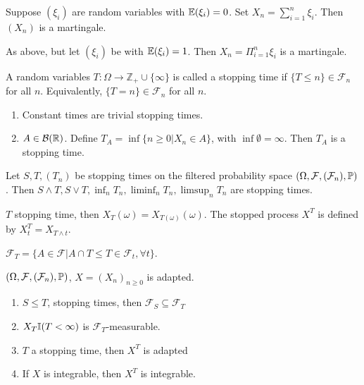 \begin{exmp}
  \label{defn:discrete_time_martingales:2}
  Suppose $(\xi_{i})$ are \iid random variables with $\E{\xi_{i}} = 0$.
  Set $X_{n} = \sum_{i=1}^{n} \xi_{i}$.  Then $(X_{n})$ is a martingale.
\end{exmp}

\begin{exmp}
  \label{defn:discrete_time_martingales:3}
  As above, but let $(\xi_{i})$ be \iid with $\E{\xi_{i}} = 1$. Then
  $X_{n} = \Pi_{i=1}^{n} \xi_{i}$ is a martingale.
\end{exmp}

\begin{defn}
  \label{defn:discrete_time_martingales:4}
  A random variables $T: \Omega \rightarrow \mathbb{Z}_{+} \cup \{ \infty \}$
  is called a stopping time if $\{ T \leq n \} \in \mathcal{F}_{n}$
  for all $n$.  Equivalently, $\{ T = n \} \in \mathcal{F}_{n}$ for
  all $n$.
\end{defn}

\begin{exmp}
  \label{defn:discrete_time_martingales:5}
  \begin{enumerate}
  \item Constant times are trivial stopping times.
  \item $A \in \mathcal{B}(\mathbb{R})$.  Define $T_{A} = \inf \{ n \geq 0 |
    X_{n} \in A \}$, with $\inf \emptyset = \infty$.  Then $T_{A}$ is a
    stopping time.
  \end{enumerate}
\end{exmp}

\begin{proposition}
  Let $S, T, (T_{n})$ be stopping times on the filtered probability
  space $(\Omega, \mathcal{F}, (\mathcal{F}_{n}), \Prob)$.  Then $S \wedge
  T, S \vee T, \inf_{n} T_{n}, \liminf_{n} T_{n}, \limsup_{n} T_{n}$
  are stopping times. 
\end{proposition}

\begin{notation}
  $T$ stopping time, then $X_{T}(\omega) = X_{T(\omega)}(\omega)$. The
  stopped process $X^{T}$ is defined by $X^{T}_{t} = X_{T \wedge t}$.

  $\mathcal{F}_{T} = \{ A \in \mathcal{F} | A \cap {T \leq T} \in
  \mathcal{F}_{t}, \forall t \}$.
\end{notation}

\begin{proposition}
  $(\Omega, \mathcal{F}, (\mathcal{F}_{n}), \Prob)$, $X = (X_{n})_{n
    \geq 0}$ is adapted.
  \begin{enumerate}
  \item $S \leq T$, stopping times, then $\mathcal{F}_{S} \subseteq \mathcal{F}_{T}$
  \item $X_{T} \I{T < \infty}$ is $\mathcal{F}_{T}$-measurable.
  \item $T$ a stopping time, then $X^{T}$ is adapted
  \item If $X$ is integrable, then $X^{T}$ is integrable.
  \end{enumerate}
\end{proposition}

